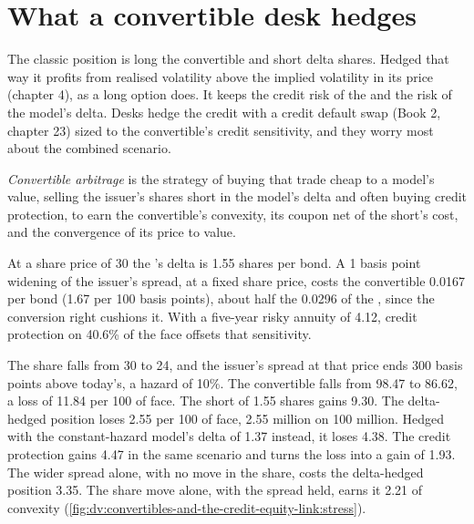 \section{What a convertible desk hedges}

The classic position is long the convertible and short delta shares. Hedged that way it profits from realised volatility above the implied
volatility in its price (chapter 4), as a long option does. It keeps the credit risk of the  and the risk of the model's delta.
Desks hedge the credit with a credit default swap (Book 2, chapter 23) sized to the convertible's credit sensitivity, and they worry most
about the combined scenario.

\begin{definition}\label{def:dv:convertibles-and-the-credit-equity-link:arb}
\emph{Convertible arbitrage} is the strategy of buying  that trade cheap to a model's value,
selling the issuer's shares short in the model's delta and often buying credit protection, to earn the convertible's convexity, its coupon
net of the short's cost, and the convergence of its price to value.
\end{definition}

\begin{example}\label{ex:dv:convertibles-and-the-credit-equity-link:hedge}
At a share price of 30 the 's delta is 1.55 shares per bond. A 1 basis point widening of the issuer's spread, at a fixed share
price, costs the convertible 0.0167 per bond (1.67 per 100 basis points), about half the 0.0296 of the , since the conversion right
cushions it. With a five-year risky annuity of 4.12, credit protection on 40.6\% of the face offsets that sensitivity.
\end{example}

\begin{example}\label{ex:dv:convertibles-and-the-credit-equity-link:stress}
The share falls from 30 to 24, and the issuer's spread at that price ends 300 basis points above today's, a hazard of 10\%. The convertible falls from
98.47 to 86.62, a loss of 11.84 per 100 of face. The short of 1.55 shares gains 9.30. The delta-hedged position loses 2.55 per 100 of face, 2.55
million on 100 million. Hedged with the constant-hazard model's delta of 1.37 instead, it loses 4.38. The credit protection gains 4.47 in the same
scenario and turns the loss into a gain of 1.93. The wider spread alone, with no move in the share, costs the delta-hedged position 3.35. The share
move alone, with the spread held, earns it 2.21 of convexity (\cref{fig:dv:convertibles-and-the-credit-equity-link:stress}).
\end{example}

